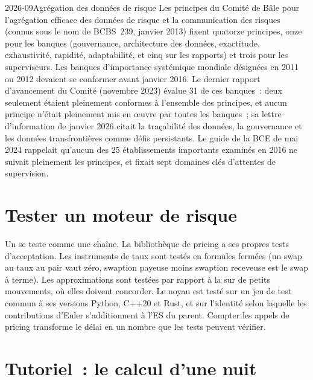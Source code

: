 \begin{dated}{2026-09}{Agrégation des données de risque}\label{dat:rc:build-a-risk-engine:bcbs239}
Les principes du Comité de Bâle pour l'agrégation efficace des données de risque et la communication des risques (connus
sous le nom de BCBS~239, janvier 2013) fixent quatorze principes, onze pour les banques (gouvernance, architecture des données,
exactitude, exhaustivité, rapidité, adaptabilité, et cinq sur les rapports) et trois pour les superviseurs. Les banques
d'importance systémique mondiale désignées en 2011 ou 2012 devaient se conformer avant janvier 2016. Le dernier
rapport d'avancement du Comité (novembre 2023) évalue 31 de ces banques~: deux seulement étaient pleinement conformes à
l'ensemble des principes, et aucun principe n'était pleinement mis en œuvre par toutes les banques~; sa lettre d'information de janvier 2026 citait
la traçabilité des données, la gouvernance et les données transfrontières comme défis persistants. Le guide de la BCE de mai 2024
rappelait qu'aucun des 25 établissements importants examinés en 2016 ne suivait pleinement les principes, et fixait
sept domaines clés d'attentes de supervision.
\end{dated}

\section{Tester un moteur de risque}

Un  se teste comme une chaîne. La bibliothèque de pricing a ses propres tests d'acceptation. Les
instruments de taux sont testés en formules fermées (un swap au taux au pair vaut zéro, swaption payeuse moins
swaption receveuse est le swap à terme). Les approximations sont testées par rapport à la  sur de petits mouvements, où
elles doivent concorder. Le noyau est testé sur un jeu de test commun à ses versions Python, C++20 et Rust, et sur
l'identité selon laquelle les contributions d'Euler s'additionnent à l'ES du parent. Compter les appels de pricing transforme le
délai en un nombre que les tests peuvent vérifier.

\section{Tutoriel~: le calcul d'une nuit}\label{tut:rc:build-a-risk-engine:tutorial}

